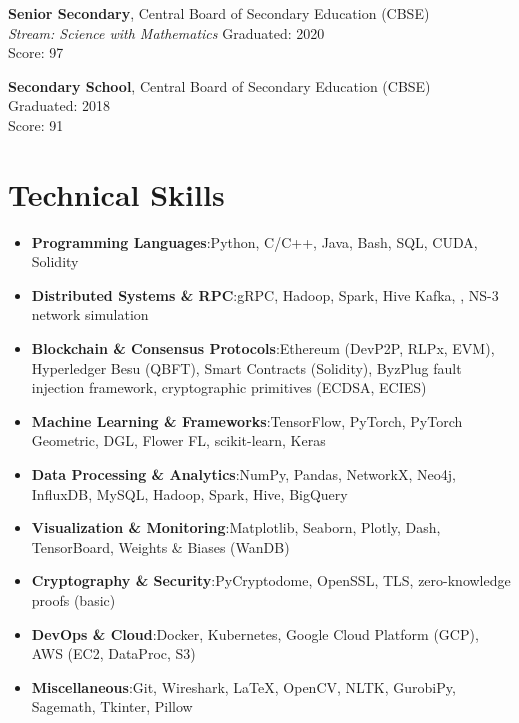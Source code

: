 \documentclass[a4paper,11pt]{article}
\newcommand{\resumeItem}[2]{
  \item{
    \textbf{#1}{:\hspace{0.5mm}#2 \vspace{-0.5mm}}
  }
}
\newcommand{\resumeSubItem}[2]{\resumeItem{#1}{#2}\vspace{-4pt}}
\newcommand{\resumeHeadingSkillStart}{\begin{itemize}[leftmargin=*,itemsep=1.7mm, rightmargin=2ex]}
\newcommand{\resumeHeadingSkillEnd}{\end{itemize}\vspace{-2mm}}
\begin{document}
\textbf{Senior Secondary}, Central Board of Secondary Education (CBSE) \\
\textit{Stream: Science with Mathematics} \hfill Graduated: 2020 \\
Score: 97%

\vspace{4pt}

\textbf{Secondary School}, Central Board of Secondary Education (CBSE) \\
\hfill Graduated: 2018 \\
Score: 91%

\vspace{-2mm}

\section{Technical Skills}
\resumeHeadingSkillStart

\resumeSubItem{Programming Languages} 
  {Python, C/C++, Java, Bash, SQL, CUDA, Solidity}

\resumeSubItem{Distributed Systems \& RPC} 
  {gRPC, Hadoop, Spark, Hive Kafka, , NS-3 network simulation}

\resumeSubItem{Blockchain \& Consensus Protocols} 
  {Ethereum (DevP2P, RLPx, EVM), Hyperledger Besu (QBFT), Smart Contracts (Solidity), ByzPlug fault injection framework, cryptographic primitives (ECDSA, ECIES)}

\resumeSubItem{Machine Learning \& Frameworks} 
  {TensorFlow, PyTorch, PyTorch Geometric, DGL, Flower FL, scikit-learn, Keras}

\resumeSubItem{Data Processing \& Analytics} 
  {NumPy, Pandas, NetworkX, Neo4j, InfluxDB, MySQL, Hadoop, Spark, Hive, BigQuery}

\resumeSubItem{Visualization \& Monitoring} 
  {Matplotlib, Seaborn, Plotly, Dash, TensorBoard, Weights \& Biases (WanDB)}

\resumeSubItem{Cryptography \& Security} 
  {PyCryptodome, OpenSSL, TLS, zero-knowledge proofs (basic)}

\resumeSubItem{DevOps \& Cloud} 
  {Docker, Kubernetes, Google Cloud Platform (GCP), AWS (EC2, DataProc, S3)}

\resumeSubItem{Miscellaneous} 
  {Git, Wireshark, LaTeX, OpenCV, NLTK, GurobiPy, Sagemath, Tkinter, Pillow}

\resumeHeadingSkillEnd

\end{document}
